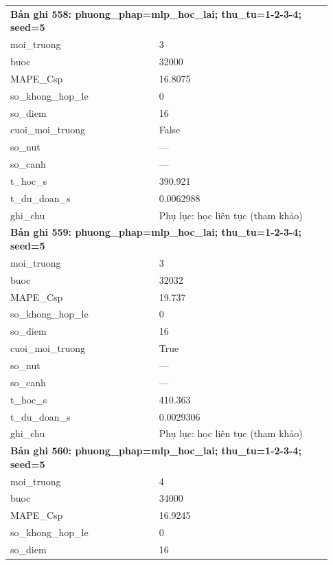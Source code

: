 \begin{longtable}{p{0.43\linewidth}p{0.50\linewidth}}
\midrule
\multicolumn{2}{p{0.95\linewidth}}{\textbf{Bản ghi 558: phuong\_phap=mlp\_hoc\_lai; thu\_tu=1-2-3-4; seed=5}} \\
moi\_\allowbreak truong & 3 \\
buoc & 32000 \\
MAPE\_\allowbreak Csp & 16.8075 \\
so\_\allowbreak khong\_\allowbreak hop\_\allowbreak le & 0 \\
so\_\allowbreak diem & 16 \\
cuoi\_\allowbreak moi\_\allowbreak truong & False \\
so\_\allowbreak nut & — \\
so\_\allowbreak canh & — \\
t\_\allowbreak hoc\_\allowbreak s & 390.921 \\
t\_\allowbreak du\_\allowbreak doan\_\allowbreak s & 0.0062988 \\
ghi\_\allowbreak chu & Phụ lục: học liên tục (tham khảo) \\
\midrule
\multicolumn{2}{p{0.95\linewidth}}{\textbf{Bản ghi 559: phuong\_phap=mlp\_hoc\_lai; thu\_tu=1-2-3-4; seed=5}} \\
moi\_\allowbreak truong & 3 \\
buoc & 32032 \\
MAPE\_\allowbreak Csp & 19.737 \\
so\_\allowbreak khong\_\allowbreak hop\_\allowbreak le & 0 \\
so\_\allowbreak diem & 16 \\
cuoi\_\allowbreak moi\_\allowbreak truong & True \\
so\_\allowbreak nut & — \\
so\_\allowbreak canh & — \\
t\_\allowbreak hoc\_\allowbreak s & 410.363 \\
t\_\allowbreak du\_\allowbreak doan\_\allowbreak s & 0.0029306 \\
ghi\_\allowbreak chu & Phụ lục: học liên tục (tham khảo) \\
\midrule
\multicolumn{2}{p{0.95\linewidth}}{\textbf{Bản ghi 560: phuong\_phap=mlp\_hoc\_lai; thu\_tu=1-2-3-4; seed=5}} \\
moi\_\allowbreak truong & 4 \\
buoc & 34000 \\
MAPE\_\allowbreak Csp & 16.9245 \\
so\_\allowbreak khong\_\allowbreak hop\_\allowbreak le & 0 \\
so\_\allowbreak diem & 16 \\

\end{longtable}
